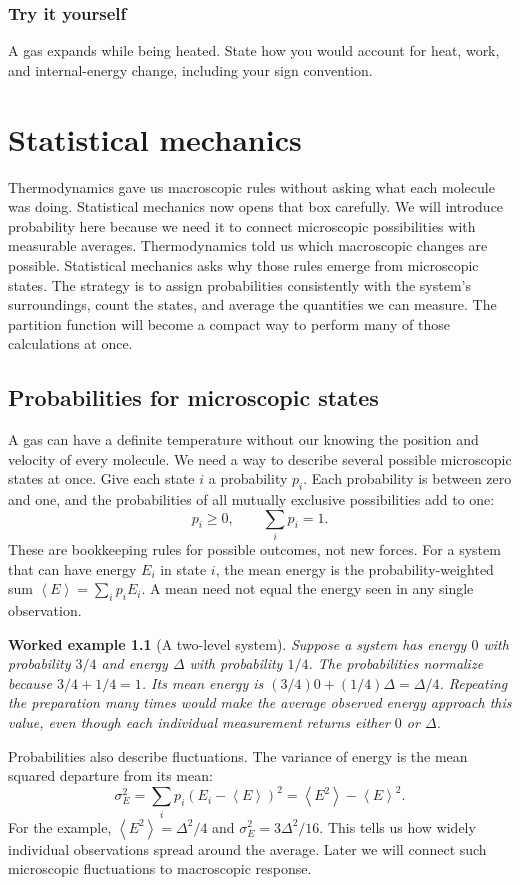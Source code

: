 \documentclass[11pt,oneside]{book}
\newcommand{\avg}[1]{\left\langle #1\right\rangle}
\theoremstyle{reviewstyle}
\newtheorem{example}{Worked example}[chapter]
\newcommand{\learningcheck}[1]{\subsection*{Try it yourself}\noindent #1\par}
\begin{document}
\learningcheck{A gas expands while being heated. State how you would account for heat, work, and internal-energy change, including your sign convention.}

\chapter{Statistical mechanics}
Thermodynamics gave us macroscopic rules without asking what each molecule was doing. Statistical mechanics now opens that box carefully. We will introduce probability here because we need it to connect microscopic possibilities with measurable averages.
Thermodynamics told us which macroscopic changes are possible. Statistical mechanics asks why those rules emerge from microscopic states. The strategy is to assign probabilities consistently with the system's surroundings, count the states, and average the quantities we can measure. The partition function will become a compact way to perform many of those calculations at once.

\section{Probabilities for microscopic states}
A gas can have a definite temperature without our knowing the position and velocity of every molecule. We need a way to describe several possible microscopic states at once. Give each state $i$ a probability $p_i$. Each probability is between zero and one, and the probabilities of all mutually exclusive possibilities add to one:
\begin{equation}
p_i\geq0,\qquad \sum_i p_i=1.
\end{equation}
These are bookkeeping rules for possible outcomes, not new forces. For a system that can have energy $E_i$ in state $i$, the mean energy is the probability-weighted sum $\avg E=\sum_i p_iE_i$. A mean need not equal the energy seen in any single observation.

\begin{example}[A two-level system]
Suppose a system has energy $0$ with probability $3/4$ and energy $\Delta$ with probability $1/4$. The probabilities normalize because $3/4+1/4=1$. Its mean energy is $(3/4)0+(1/4)\Delta=\Delta/4$. Repeating the preparation many times would make the average observed energy approach this value, even though each individual measurement returns either $0$ or $\Delta$.
\end{example}

Probabilities also describe fluctuations. The variance of energy is the mean squared departure from its mean:
\begin{equation}
\sigma_E^2=\sum_i p_i(E_i-\avg E)^2
=\avg{E^2}-\avg E^2.
\end{equation}
For the example, $\avg{E^2}=\Delta^2/4$ and $\sigma_E^2=3\Delta^2/16$. This tells us how widely individual observations spread around the average. Later we will connect such microscopic fluctuations to macroscopic response.
\end{document}

